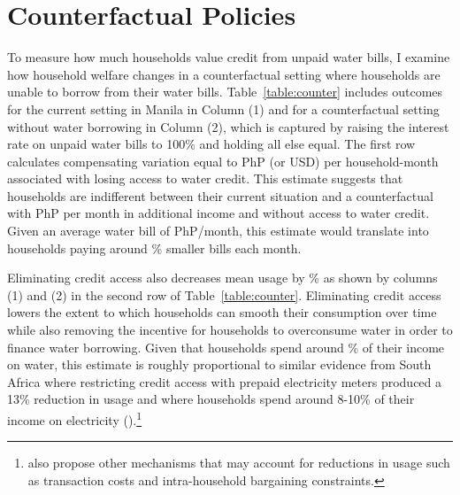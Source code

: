 \documentclass[12pt]{article}
\begin{document}
\section{Counterfactual Policies}\label{section:counterfactuals}
To measure how much households value credit from unpaid water bills, I examine how household welfare changes in a counterfactual setting where households are unable to borrow from their water bills.  Table~\ref{table:counter} includes outcomes for the current setting in Manila in Column (1) and for a counterfactual setting without water borrowing in Column (2), which is captured by raising the interest rate on unpaid water bills to 100\% and holding all else equal.  The first row calculates compensating variation equal to PhP (or USD) per household-month associated with losing access to water credit.  This estimate suggests that households are indifferent between their current situation and a counterfactual with PhP per month in additional income and without access to water credit.  Given an average water bill of PhP/month, this estimate would translate into households paying around \unskip\% smaller bills each month.  

Eliminating credit access also decreases mean usage by \unskip\% as shown by columns (1) and (2) in the second row of Table~\ref{table:counter}.  Eliminating credit access lowers the extent to which households can smooth their consumption over time while also removing the incentive for households to overconsume water in order to finance water borrowing.  Given that households spend around \unskip\% of their income on water, this estimate is roughly proportional to similar evidence from South Africa where restricting credit access with prepaid electricity meters produced a 13\% reduction in usage and where households spend around 8-10\% of their income on electricity (\cite{jack2016charging}).\footnote{\cite{jack2016charging} also propose other mechanisms that may account for reductions in usage such as transaction costs and intra-household bargaining constraints.}
\end{document}
